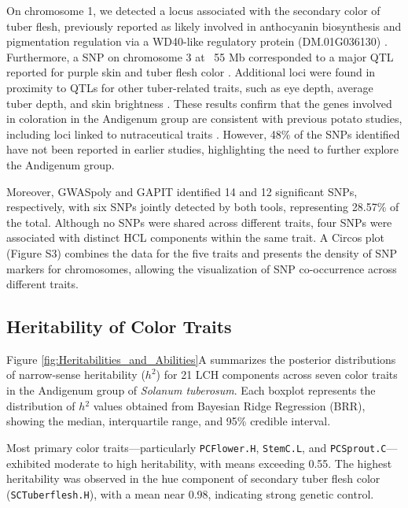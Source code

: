 \documentclass[pdflatex,sn-mathphys-ay]{sn-jnl}%
\begin{document}
On chromosome 1, we detected a locus associated with the secondary color of tuber flesh, previously reported as likely involved in anthocyanin biosynthesis and pigmentation regulation via a WD40-like regulatory protein (DM.01G036130) \citep{liu2020wd40, sajeevan2023comprehensive}. Furthermore, a SNP on chromosome 3 at ~55 Mb corresponded to a major QTL reported for purple skin and tuber flesh color \citep{pandey2021genetic, sharma2024genotyping}. Additional loci were found in proximity to QTLs for other tuber-related traits, such as eye depth, average tuber depth, and skin brightness \citep{sharma2024genotyping,pandey2022genomic}. These results confirm that the genes involved in coloration in the Andigenum group are consistent with previous potato studies, including loci linked to nutraceutical traits \citep{berdugo2023phenotypic,riveros2022uncovering,parra2019chromosomes}. However, 48\% of the SNPs identified have not been reported in earlier studies, highlighting the need to further explore the Andigenum group.


Moreover, GWASpoly and GAPIT identified 14 and 12 significant SNPs, respectively, with six SNPs jointly detected by both tools, representing 28.57\% of the total. Although no SNPs were shared across different traits, four SNPs were associated with distinct HCL components within the same trait. A Circos plot (Figure S3) combines the data for the five traits and presents the density of SNP markers for chromosomes, allowing the visualization of SNP co-occurrence across different traits.


\subsection{Heritability of Color Traits}
Figure \ref{fig:Heritabilities_and_Abilities}A summarizes the posterior distributions of narrow-sense heritability ($h^2$) for 21 LCH components across seven color traits in the Andigenum group of \textit{Solanum tuberosum}. Each boxplot represents the distribution of $h{{}^2}$ values obtained from Bayesian Ridge Regression (BRR), showing the median, interquartile range, and 95\% credible interval.

Most primary color traits---particularly \texttt{PCFlower.H}, \texttt{StemC.L}, and \texttt{PCSprout.C}---exhibited moderate to high heritability, with means exceeding 0.55. The highest heritability was observed in the hue component of secondary tuber flesh color (\texttt{SCTuberflesh.H}), with a mean near 0.98, indicating strong genetic control.
\end{document}
